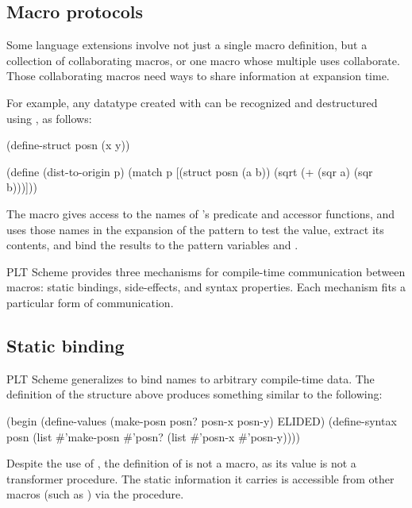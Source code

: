 \begin{schemeregion}
\section{Macro protocols}
\label{sect:protocols}

Some language extensions involve not just a single macro definition, but
a collection of collaborating macros, or one macro whose multiple uses
collaborate. Those collaborating macros need ways to share information
at expansion time.

For example, any datatype created with  can be
recognized and destructured using , as follows:
\begin{schemedisplay}
(define-struct posn (x y))

(define (dist-to-origin p)
  (match p
    [(struct posn (a b))
     (sqrt (+ (sqr a) (sqr b)))]))
\end{schemedisplay}
The  macro gives  access to the
names of 's predicate and accessor functions, and
 uses those names in the expansion of the pattern to
test the value, extract its contents, and bind the results to the
pattern variables  and .

PLT Scheme provides three mechanisms for compile-time communication between macros:
static bindings, side-effects, and syntax properties. Each mechanism
fits a particular form of communication.

\subsection{Static binding}

PLT Scheme generalizes  to bind names to
arbitrary compile-time data. The definition of the 
structure above produces something similar to the following:
\begin{schemedisplay}
(begin
  (define-values (make-posn posn? posn-x posn-y) ELIDED)
  (define-syntax posn
    (list #'make-posn
          #'posn?
          (list #'posn-x #'posn-y))))
\end{schemedisplay}
Despite the use of , the definition of
 is not a macro, as its value is not a transformer
procedure. The static information it carries is accessible from other
macros (such as ) via the 
procedure.


\end{schemeregion}
